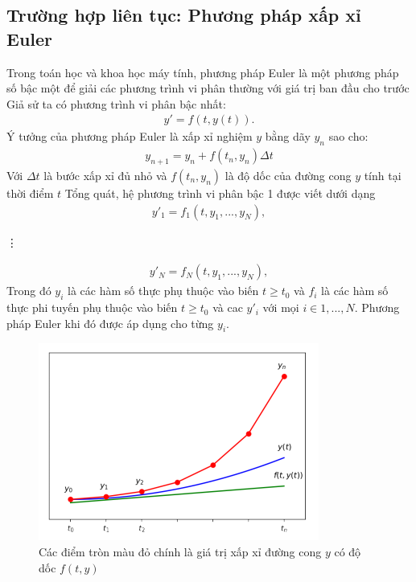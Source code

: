 \documentclass[a4paper]{article}
\begin{document}
\subsection{Trường hợp liên tục: Phương pháp xấp xỉ Euler}
Trong toán học và khoa học máy tính, phương pháp Euler là một phương pháp số bậc một để giải các phương trình vi phân thường với giá trị ban đầu cho trước\\
Giả sử ta có phương trình vi phân bậc nhất:
\begin{align}
    y' = f(t,y(t)).
\end{align}
Ý tưởng của phương pháp Euler là xấp xỉ nghiệm $y$ bằng dãy ${y_{n}}$ sao cho:
\begin{align}
    y_{n+1} = y_{n} + f(t_{n},y_{n}) \Delta{t}
\end{align}
Với $\Delta{t}$ là bước xấp xỉ đủ nhỏ và $f(t_{n},y_{n})$ là độ dốc của đường cong $y$ tính tại thời điểm $t$
Tổng quát, hệ phương trình vi phân bậc 1 được viết dưới dạng
\begin{align}
    y'_{1} = f_{1}(t,y_{1},...,y_{N}),
\end{align}
\centerline{\vdots}
\begin{align}
    y'_{N} = f_{N}(t,y_{1},...,y_{N}),
\end{align}
Trong đó $y_{i}$ là các hàm số thực phụ thuộc vào biến  $t \geq t_{0}$ và $f_{i}$ là các hàm số thực phi tuyến phụ thuộc vào biến  $t \geq t_{0}$ và cac $y'_{i}$ với mọi $i \in {1,...,N}$. Phương pháp Euler khi đó được áp dụng cho từng $y_{i}$.
\begin{center}
    \begin{figure}[htp]
    \begin{center}
     \includegraphics[scale=1.3]{Images/img1.2.PNG}
    \end{center}
    \caption{Các điểm tròn màu đỏ chính là giá trị xấp xỉ đường cong $y$ có độ dốc $f(t,y)$}
    \label{refhinh2}
    \end{figure}
\end{center}
\end{document}
